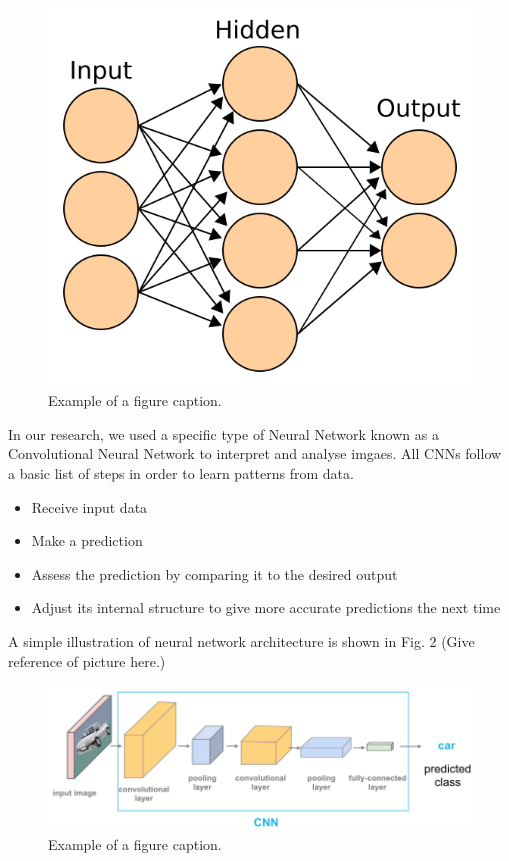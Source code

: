 \documentclass[conference]{IEEEtran}
\begin{document}
\begin{figure}[h]  %
  \centering
  \includegraphics[scale=0.2]{images/Artificial_neural_network.png}
  \caption{Example of a figure caption.}
  \label{fig:test_img}
\end{figure}

In our research, we used a specific type of Neural Network known as a Convolutional Neural Network to interpret and analyse imgaes. All CNNs follow a basic list of steps in order to learn patterns from data.
\begin{itemize}
\item Receive input data
\item Make a prediction
\item Assess the prediction by comparing it to the desired output
\item Adjust its internal structure to give more accurate predictions the next time
\end{itemize}

A simple illustration of neural network architecture is shown in Fig. 2 (Give reference of picture here.)
\begin{figure}[h]
 \centering
  \includegraphics[scale=0.2]{images/ConvolutionalNeuralNetwork.png}
  \caption{Example of a figure caption.}
  \label{fig:test_img}
\end{figure}
\end{document}
